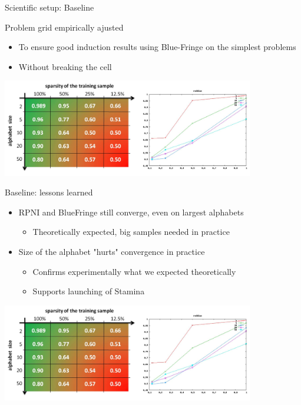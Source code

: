 \begin{frame}{Scientific setup: Baseline}

  Problem grid empirically ajusted 
	\begin{itemize}
	\item To ensure good induction results using Blue-Fringe on the simplest problems
	\item Without breaking the cell
	\end{itemize}

  \begin{center}
    \includegraphics[width=11cm]{images/stamina_baseline.jpg}
  \end{center}

\end{frame}

\begin{frame}{Baseline: lessons learned}

  \begin{itemize}
    \item RPNI and BlueFringe still converge, even on largest alphabets
	  \begin{itemize}
	    \item Theoretically expected, big samples needed in practice
	  \end{itemize}
    \item Size of the alphabet "hurts" convergence in practice
	  \begin{itemize}
	    \item Confirms experimentally what we expected theoretically 
	    \item Supports launching of Stamina
	  \end{itemize}
  \end{itemize}

  \begin{center}
    \includegraphics[width=11cm]{images/stamina_baseline.jpg}
  \end{center}

\end{frame}

